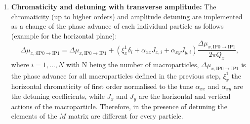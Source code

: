 {{\begin{enumerate}
\begin{equation}
\begin{pmatrix}
                \cos(\Delta \mu_{x, \mathrm{IP0 \to IP1 }}) & \sin(\Delta \mu_{x, \mathrm{IP0 \to IP1 }})\\
                 - \sin(\Delta \mu_{x, \mathrm{IP0 \to IP1 }})  &\cos(\Delta \mu_{x, \mathrm{IP0 \to IP1 } }) 
                \end{pmatrix}  \begin{pmatrix}
                    \sqrt{\beta_{x, IP1}} & 0 \\ 
                    -\frac{\alpha_{x, IP1}}{\sqrt{\beta_{x, IP1}}} & \frac{1}{\sqrt{\beta_{x, IP1}}}
                    \end{pmatrix} 
    \end{equation}
    where $\alpha_{x, \mathrm{IP0/IP1}}$ and $\beta{x, \mathrm{IP0/IP1}}$ are the optics paramters at the interaction points IP0 and IP1 respectively and $\Delta \mu_{x, \mathrm{IP0 \to IP1 }}$ the phase advance from IP0 to IP1. As smooth approximation is used, the phase advance equals: 
    \begin{equation}\label{eq:phase_advance_smooth_approximation}
        \Delta \mu_{x, \mathrm{IP0 \to IP1 }} = Q_x \frac{L}{C},
    \end{equation}
    where $Q_x$ is the horizontal betatron tune, $C$ the machine circumference and $L$ the length of the corresponding segment. It should be noted that if no detuning source is added (see next step) the matrix $M$ is the same for all particles.
    \item \textbf{Chromaticity and detuning with transverse amplitude:} The chromaticity (up to higher orders) and amplitude detuning are implemented as a change of the phase advance of each individual particle as follows (example for the horizontal plane):
    \begin{equation}\label{eq:change_phase_advance_detunign}
        \Delta \mu_{x, i \mathrm{IP0 \to IP1 }} = \Delta \mu_{x, \mathrm{IP0 \to IP1 }} + (\xi^{1}_x \delta_i + \alpha_{xx}J_{x, i} + \alpha_{xy}J_{y,i}) \frac{\Delta \mu_{x, \mathrm{IP0 \to IP1 }}}{2\pi Q_x}, 
    \end{equation}
    where $i=1, ..., N$ with N being the number of macroparticles, $\Delta \mu_{x, \mathrm{IP0 \to IP1 }}$ is the phase advance for all macroparticles defined in the previous step, $\xi_x^{1}$ the horizontal chromaticity of first order normalised to the tune $\alpha_{xx}$ and $\alpha_{xy}$ are the detuning coefficients, while $J_x$ and $J_y$ are the horizontal and vertical actions of the macroparticle. Therefore, in the presence of detuning the elements of the $M$ matrix are different for every particle.


\end{enumerate}}}

